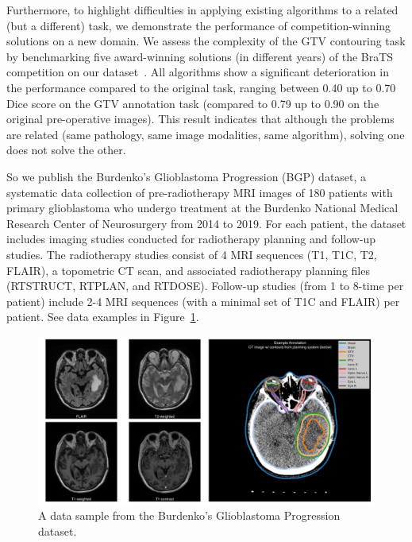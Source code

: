 Furthermore, to highlight difficulties in applying existing algorithms to a related (but a different) task, we demonstrate the performance of competition-winning solutions on a new domain. We assess the complexity of the GTV contouring task by benchmarking five award-winning solutions (in different years) of the BraTS competition on our dataset~\cite{kofler2020brats,isensee2018nnu,kickingereder2019automated,bakas2017advancing}. All algorithms show a significant deterioration in the performance compared to the original task, ranging between 0.40 up to 0.70 Dice score on the GTV annotation task (compared to 0.79 up to 0.90 on the original pre-operative images). This result indicates that although the problems are related (same pathology, same image modalities, same algorithm), solving one does not solve the other.


So we publish the Burdenko's Glioblastoma Progression (BGP) dataset, a systematic data collection of pre-radiotherapy MRI images of 180 patients with primary glioblastoma who undergo treatment at the Burdenko National Medical Research Center of Neurosurgery from 2014 to 2019. For each patient, the dataset includes imaging studies conducted for radiotherapy planning and follow-up studies. The radiotherapy studies consist of 4 MRI sequences (T1, T1C, T2, FLAIR), a topometric CT scan, and associated radiotherapy planning files (RTSTRUCT, RTPLAN, and RTDOSE). Follow-up studies (from 1 to 8-time per patient) include 2-4 MRI sequences (with a minimal set of T1C and FLAIR) per patient. See data examples in Figure~\ref{fig:gbpd}. %

\begin{figure}
	\includegraphics[width=\linewidth]{Dissertation/Figures/4_da_bench/Burdenko-GBM-Progression-scaled.jpg}
	\caption{A data sample from the Burdenko's Glioblastoma Progression dataset.}
	\label{fig:gbpd}
\end{figure}


